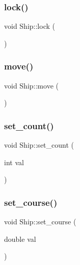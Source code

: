 \mbox{\label{class_ship_a21d38a209adf9d1828fbefb85b4ecf1d}} 
\subsubsection{\texorpdfstring{lock()}{lock()}}
{\footnotesize\ttfamily void Ship\+::lock (\begin{DoxyParamCaption}{ }\end{DoxyParamCaption})\hspace{0.3cm}{\ttfamily [inline]}}

\mbox{\label{class_ship_a20a5c250b9503f8452d17bd4db0caa59}} 
\subsubsection{\texorpdfstring{move()}{move()}}
{\footnotesize\ttfamily void Ship\+::move (\begin{DoxyParamCaption}{ }\end{DoxyParamCaption})}

\mbox{\label{class_ship_a6233340d0e09dcc5518572538a2042d5}} 
\subsubsection{\texorpdfstring{set\_count()}{set\_count()}}
{\footnotesize\ttfamily void Ship\+::set\+\_\+count (\begin{DoxyParamCaption}\item[{int}]{val }\end{DoxyParamCaption})}

\mbox{\label{class_ship_a655322cd5330201cfe7e52505a51a1bf}} 
\subsubsection{\texorpdfstring{set\_course()}{set\_course()}}
{\footnotesize\ttfamily void Ship\+::set\+\_\+course (\begin{DoxyParamCaption}\item[{double}]{val }\end{DoxyParamCaption})}

